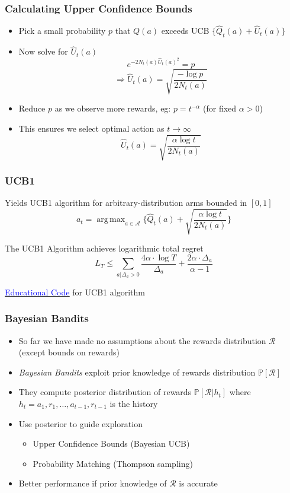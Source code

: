 \documentclass[handout]{beamer}
\DeclareMathOperator*{\argmax}{arg\,max}
\begin{document}
\begin{frame}
\frametitle{Calculating Upper Confidence Bounds}
\pause
\begin{itemize}[<+->]
\item Pick a small probability $p$ that $Q(a)$ exceeds UCB $\{\hat{Q}_t(a) + \hat{U}_t(a)\}$
\item Now solve for $\hat{U}_t(a)$
$$e^{-2N_t(a)\hat{U}_t(a)^2} = p$$
$$\Rightarrow \hat{U}_t(a) = \sqrt{\frac {-\log p} {2 N_t(a)}}$$
\item Reduce $p$ as we observe more rewards, eg: $p = t^{-\alpha}$ (for fixed $\alpha > 0$)
\item This ensures we select optimal action as $t\rightarrow \infty$
$$\hat{U}_t(a) = \sqrt{\frac {\alpha \log t} {2N_t(a)}}$$
\end{itemize}
\end{frame}

\begin{frame}
\frametitle{UCB1}
\pause
Yields UCB1 algorithm for arbitrary-distribution arms bounded in $[0,1]$
$$a_t = \argmax_{a\in \mathcal{A}} \{ \hat{Q}_t(a) + \sqrt{\frac {\alpha \log t} {2N_t(a)}} \}$$
\begin{theorem}
The UCB1 Algorithm achieves logarithmic total regret
$$L_T \leq \sum_{a|\Delta_a > 0} \frac {4\alpha \cdot \log T} {\Delta_a} + \frac {2\alpha \cdot \Delta_a}{\alpha - 1}$$
\end{theorem}
\href{https://github.com/TikhonJelvis/RL-book/tree/master/rl/chapter14/ucb1.py}{\underline{\textcolor{blue}{Educational Code}}} for UCB1 algorithm
\end{frame}

\begin{frame}
\frametitle{Bayesian Bandits}
\pause
\begin{itemize}
\item So far we have made no assumptions about the rewards distribution $\mathcal{R}$ (except bounds on rewards)
\item {\em Bayesian Bandits} exploit prior knowledge of rewards distribution $\mathbb{P}[\mathcal{R}]$
\item They compute posterior distribution of rewards $\mathbb{P}[\mathcal{R}|h_t]$ where $h_t = a_1,r_1, \ldots, a_{t-1}, r_{t-1}$ is the history
\item Use posterior to guide exploration
\begin{itemize}
\item Upper Confidence Bounds (Bayesian UCB)
\item Probability Matching (Thompson sampling)
\end{itemize}
\item Better performance if prior knowledge of $\mathcal{R}$ is accurate
\end{itemize}
\end{frame}
\end{document}

